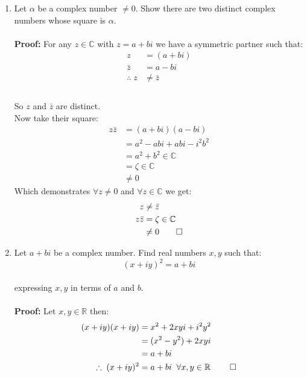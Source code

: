 \begin{enumerate}
	\item Let $\alpha$ be a complex number $\neq 0.$ Show there are two distinct complex numbers whose square is $\alpha.$ \\
	\\
	\textbf{Proof:}
	For any $z \in \mathbb{C}$ with $z = a + bi$ we have a symmetric partner such that: 
	\begin{align*}
		z &= (a + bi) \\
		\bar{z} &= a - bi \\
		\therefore \; z &\neq \bar{z} \\
	\end{align*}
	\\
	So $z$ and $\bar{z}$ are distinct. \\

	Now take their square:
	\begin{align*}
		z \bar{z} &= (a + bi)(a - bi) \\
		&= a^2 -abi +abi -i^2 b^2 \\
		&= a^2 + b^2 \in \mathbb{C} \\
		&= \zeta \in \mathbb{C} \\
		&\neq 0
	\end{align*}
	Which demonstrates $\forall z \neq 0$ and $\forall z \in \mathbb{C}$ we get:
	\begin{align*}
		z & \neq \bar{z} \\
		z \bar{z} &= \zeta \in \mathbb{C} \\
		&\neq 0 \qed
	\end{align*}


	\item Let $a + bi$ be a complex number. Find real numbers $x, y$ such that:
	\[(x + iy)^2 = a + bi\] \\
	expressing $x, y$ in terms of $a$ and $b.$ \\
	\\
	\textbf{Proof:}
	Let $x, y \in \mathbb{R}$ then:
	\begin{align*}
		(x + iy)(x + iy) &= x^2 +2xyi + i^2 y^2 \\
		&= (x^2 - y^2) + 2xyi \\
		&= a + bi \\
		\therefore \; (x + iy)^2 &= a + bi \;\; \forall x, y \in \mathbb{R} \; \qed
	\end{align*}
	 


\end{enumerate}
